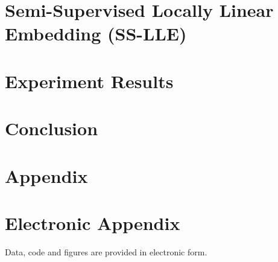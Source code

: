\documentclass[12pt]{article}
\begin{document}
\section{Semi-Supervised Locally Linear Embedding (SS-LLE)}
\label{sslle}


\section{Experiment Results}
\label{experiment}


\section{Conclusion}
\label{concl}


\newpage

    


\setcounter{page}{5}

\appendix

\section{Appendix}
\label{app}

\newpage

\section{Electronic Appendix}
\label{el_app}

Data, code and figures are provided in electronic form.

\newpage
    

\RaggedRight


\newpage

\end{document}
